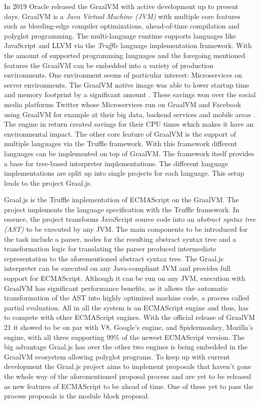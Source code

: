 In 2019 Oracle released the GraalVM \cite{graalVMStart} with active development up to present days. GraalVM  is a \emph{Java Virtual Machine (JVM)} with multiple core features such as bleeding-edge compiler optimizations, ahead-of-time compilation and polyglot programming. The multi-language runtime supports languages like JavaScript and LLVM via the \emph{Truffle} language implementation framework. With the amount of supported programming languages and the foregoing mentioned features the GraalVM can be embedded into a variety of production environments. One environment seems of particular interest: Microservices on server environments. The GraalVM native image was able to lower startup time and memory footprint by a significant amount \cite{graalVMNative}. These savings won over the social media platforms Twitter whose Microservices run on GraalVM \cite{graalTwitter} and Facebook using GraalVM for example at their big data, backend services and mobile areas \cite{facebook}. The engine in return created savings for their CPU times which makes it have an environmental impact. The other core feature of GraalVM is the support of multiple languages via the Truffle framework. With this framework different languages can be implemented on top of GraalVM. \cite{graalVMIntro} The framework itself provides a base for tree-based interpreter implementations. The different language implementations are split up into single projects for each language. This setup leads to the project Graal.js.

Graal.js \cite{Graaljs} is the Truffle implementation of ECMAScript on the GraalVM. The project implements the language specification with the Truffle framework. In essence, the project transforms JavaScript source code into an \emph{abstract syntax tree (AST)} to be executed by any JVM. The main components to be introduced for the task include a parser, nodes for the resulting abstract syntax tree and a transformation logic for translating the parser produced intermediate representation to the aforementioned abstract syntax tree. The Graal.js interpreter can be executed on any Java-compliant JVM and provides full support for ECMAScript. Although it can be run on any JVM, execution with GraalVM has significant performance benefits, as it allows the automatic transformation of the AST into highly optimized machine code, a process called partial evaluation. All in all the system is an ECMAScript engine and thus, has to compete with other ECMAScript engines. With the official release of GraalVM 21 it showed to be on par with V8, Google's engine, and Spidermonkey, Mozilla's engine, with all three supporting 99\% of the newest ECMAScript version\cite{kangax1}. The big advantage Graal.js has over the other two engines is being embedded in the GraalVM ecosystem allowing polyglot programs. To keep up with current development the Graal.js project aims to implement proposals that haven't gone the whole way of the aforementioned proposal process and are yet to be released as new features of ECMAScript to be ahead of time. One of these yet to pass the process proposals is the module block proposal.

